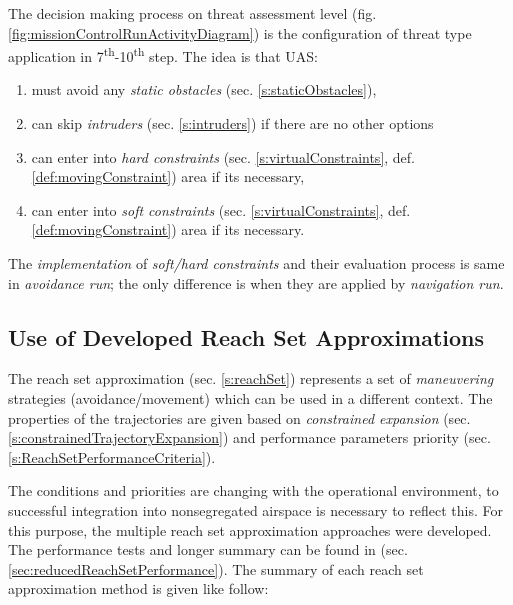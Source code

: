 The decision making process on threat assessment level (fig. \ref{fig:missionControlRunActivityDiagram}) is the configuration of threat type application in 7\textsuperscript{th}-10\textsuperscript{th} step. The idea is that UAS:
\begin{enumerate}
    \item must avoid any \emph{static obstacles} (sec. \ref{s:staticObstacles}),
    
    \item can skip \emph{intruders} (sec. \ref{s:intruders}) if there are no other options
    
    \item can enter into \emph{hard constraints} (sec. \ref{s:virtualConstraints}, def. \ref{def:movingConstraint}) area if its necessary,
    
    \item can enter into \emph{soft constraints} (sec. \ref{s:virtualConstraints}, def. \ref{def:movingConstraint}) area if its necessary.
\end{enumerate}

\begin{note}
    The \emph{implementation} of \emph{soft/hard constraints} and their evaluation process is same in \emph{avoidance run}; the only difference is when they are applied by \emph{navigation run}.
\end{note}
    
\subsection{Use of Developed Reach Set Approximations}\label{s:conclusionReachSet}

\noindent The reach set approximation (sec. \ref{s:reachSet}) represents a set of  \emph{maneuvering} strategies (avoidance/movement) which can be used in a different context. The properties of the trajectories are given based on \emph{constrained expansion} (sec. \ref{s:constrainedTrajectoryExpansion}) and performance parameters priority (sec. \ref{s:ReachSetPerformanceCriteria}).

The conditions and priorities are changing with the operational environment, to successful integration into nonsegregated airspace is necessary to reflect this.  For this purpose, the multiple reach set approximation approaches were developed. The performance tests and longer summary can be found in (sec. \ref{sec:reducedReachSetPerformance}). The summary of each reach set approximation method is given like follow:

